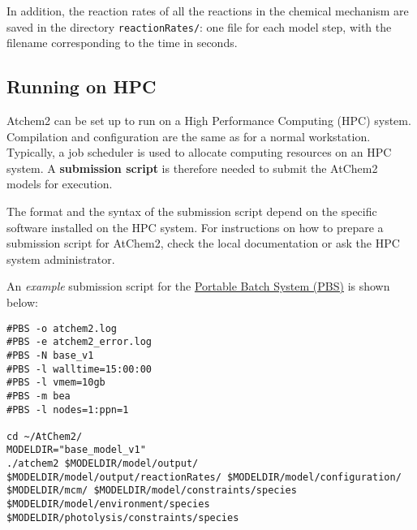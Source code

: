 In addition, the reaction rates of all the reactions in the chemical
mechanism are saved in the directory \texttt{reactionRates/}: one file
for each model step, with the filename corresponding to the time in
seconds.

\subsection{Running on HPC}\label{running-on-hpc}

Atchem2 can be set up to run on a High Performance Computing (HPC)
system. Compilation and configuration are the same as for a normal
workstation. Typically, a job scheduler is used to allocate computing
resources on an HPC system. A \textbf{submission script} is therefore
needed to submit the AtChem2 models for execution.

The format and the syntax of the submission script depend on the
specific software installed on the HPC system. For instructions on how
to prepare a submission script for AtChem2, check the local
documentation or ask the HPC system administrator.

An \emph{example} submission script for the
\href{https://en.wikipedia.org/wiki/Portable_Batch_System}{Portable
Batch System (PBS)} is shown below:

\begin{verbatim}
#PBS -o atchem2.log
#PBS -e atchem2_error.log
#PBS -N base_v1
#PBS -l walltime=15:00:00
#PBS -l vmem=10gb
#PBS -m bea
#PBS -l nodes=1:ppn=1

cd ~/AtChem2/
MODELDIR="base_model_v1"
./atchem2 $MODELDIR/model/output/ $MODELDIR/model/output/reactionRates/ $MODELDIR/model/configuration/ $MODELDIR/mcm/ $MODELDIR/model/constraints/species $MODELDIR/model/environment/species $MODELDIR/photolysis/constraints/species
\end{verbatim}
